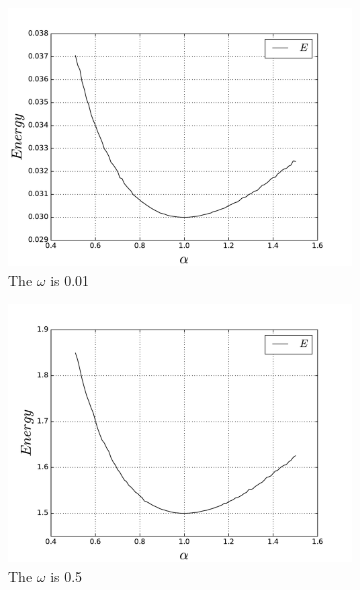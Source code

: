 \documentclass[10pt]{article}
\begin{document}
\begin{figure}[h!] 
  \begin{subfigure}[b]{0.6\linewidth}
    \centering
    \includegraphics[width=1.1\linewidth]{energy_on_alpha_001} 
    \caption{The $\omega$ is 0.01} 
    \label{fig1:a} 
    \vspace{1ex}
  \end{subfigure}%
  \begin{subfigure}[b]{0.6\linewidth}
    \centering
    \includegraphics[width=1.1\linewidth]{energy_on_alpha_05} 
    \caption{The $\omega$ is 0.5} 
    \label{fig1:b} 
    \vspace{1ex}
  \end{subfigure} 
  \begin{subfigure}[b]{0.6\linewidth}

\end{subfigure}
\end{figure}
\end{document}
